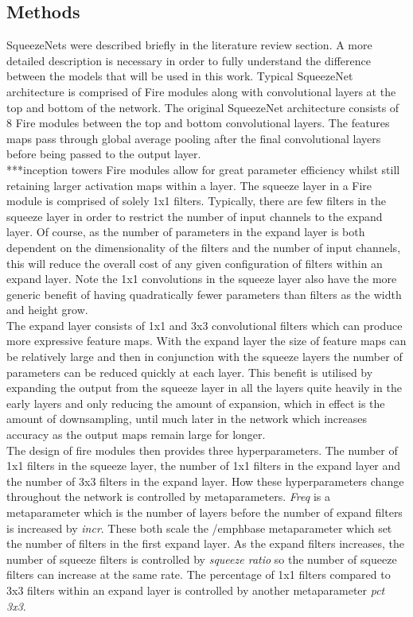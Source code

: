 \documentclass{article}
\begin{document}
\subsection*{Methods}
SqueezeNets were described briefly in the literature review section. A more detailed description is necessary in order to fully understand the difference between the models that will be used in this work. Typical SqueezeNet architecture is comprised of Fire modules along with convolutional layers at the top and bottom of the network. The original SqueezeNet architecture consists of 8 Fire modules between the top and bottom convolutional layers. The features maps pass through global average pooling after the final convolutional layers before being passed to the output layer.\\
***inception towers
Fire modules allow for great parameter efficiency whilst still retaining larger activation maps within a layer. The squeeze layer in a Fire module is comprised of solely 1x1 filters. Typically, there are few filters in the squeeze layer in order to restrict the number of input channels to the expand layer. Of course, as the number of parameters in the expand layer is both dependent on the dimensionality of the filters and the number of input channels, this will reduce the overall cost of any given configuration of filters within an expand layer. Note the 1x1 convolutions in the squeeze layer also have the more generic benefit of having quadratically fewer parameters than filters as the width and height grow. \\

The expand layer consists of 1x1 and 3x3 convolutional filters which can produce more expressive feature maps. With the expand layer the size of feature maps can be relatively large and then in conjunction with the squeeze layers the number of parameters can be reduced quickly at each layer. This benefit is utilised by expanding the output from the squeeze layer in all the layers quite heavily in the early layers and only reducing the amount of expansion, which in effect is the amount of downsampling, until much later in the network which increases accuracy as the output maps remain large for longer.\\

The design of fire modules then provides three hyperparameters. The number of 1x1 filters in the squeeze layer, the number of 1x1 filters in the expand layer and the number of 3x3 filters in the expand layer. How these hyperparameters change throughout the network is controlled by metaparameters. \emph{Freq} is a metaparameter which is the number of layers before the number of expand filters is increased by \emph{incr}. These both scale the /emph{base} metaparameter which set the number of filters in the first expand layer. As the expand filters increases, the number of squeeze filters is controlled by \emph{squeeze ratio} so the number of squeeze filters can increase at the same rate. The percentage of 1x1 filters compared to 3x3 filters within an expand layer is controlled by another metaparameter \emph{pct 3x3}. \\
\end{document}
